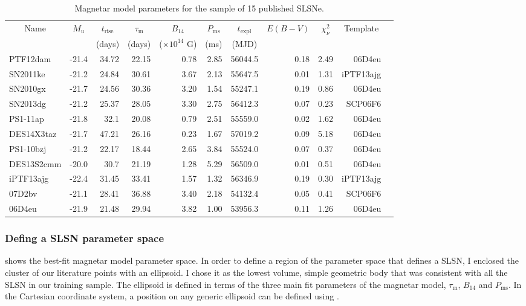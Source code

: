 \begin{table}
\begin{center}
\caption{Magnetar model parameters for the sample of 15 published SLSNe.}
\label{table:Magnetar}
\begin{tabular}{|l|r|r|r|r|r|r|r|r|r|r|}
\hline
  \multicolumn{1}{|c|}{Name} &
  \multicolumn{1}{c|}{$M_u$} &
  \multicolumn{1}{c|}{$t_\mathrm{rise}$} &
  \multicolumn{1}{c|}{$\tau_\mathrm{m}$} &
  \multicolumn{1}{c|}{$B_{14}$} &
  \multicolumn{1}{c|}{$P_{\mathrm{ms}}$} &
  \multicolumn{1}{c|}{$t_\mathrm{expl}$} &
  \multicolumn{1}{c|}{$E(B-V)$} &
  \multicolumn{1}{c|}{$\chi^2_{\nu}$} &
  \multicolumn{1}{c|}{Template} \\ & &
  \multicolumn{1}{c|}{(days)} &
  \multicolumn{1}{c|}{(days)} &
  \multicolumn{1}{c|}{($\times10^{14}$ G)} &
  \multicolumn{1}{c|}{(ms)} &
  \multicolumn{1}{c|}{(MJD)} & \\
\hline
  PTF12dam & -21.4 & 34.72 & 22.15 & 0.78 & 2.85 & 56044.5 & 0.18 & 2.49 & 06D4eu\\
  SN2011ke & -21.2 & 24.84 & 30.61 & 3.67 & 2.13 & 55647.5 & 0.01 & 1.31 & iPTF13ajg\\
  SN2010gx & -21.7 & 24.56 & 30.36 & 3.20 & 1.54 & 55247.1 & 0.19 & 0.86 & 06D4eu\\
  SN2013dg & -21.2 & 25.37 & 28.05 & 3.30 & 2.75 & 56412.3 & 0.07 & 0.23 & SCP06F6\\
  PS1-11ap & -21.8 & 32.1 & 20.08 & 0.79 & 2.51 & 55559.0 & 0.02 & 1.62 & 06D4eu\\
  DES14X3taz & -21.7 & 47.21 & 26.16 & 0.23 & 1.67 & 57019.2 & 0.09 & 5.18 & 06D4eu\\
  PS1-10bzj & -21.2 & 22.17 & 18.44 & 2.65 & 3.84 & 55524.0 & 0.07 & 0.37 & 06D4eu\\
  DES13S2cmm & -20.0 & 30.7 & 21.19 & 1.28 & 5.29 & 56509.0 & 0.01 & 0.51 & 06D4eu\\
  iPTF13ajg & -22.4 & 31.45 & 33.41 & 1.57 & 1.32 & 56346.9 & 0.19 & 0.30 & iPTF13ajg\\
  07D2bv & -21.1 & 28.41 & 36.88 & 3.40 & 2.18 & 54132.4 & 0.05 & 0.41 & SCP06F6\\
  06D4eu & -21.9 & 21.48 & 29.94 & 3.82 & 1.00 & 53956.3 & 0.11 & 1.26 & 06D4eu\\
\hline\end{tabular}
\end{center}
\end{table}

\subsubsection{Defing a SLSN parameter space}
 shows the best-fit magnetar model parameter space. In order to define a region of the parameter space that defines a SLSN, I enclosed the cluster of our literature points with an ellipsoid. I chose it as the lowest volume, simple geometric body that was consistent with all the SLSN in our training sample. The ellipsoid is defined in terms of the three main fit parameters of the magnetar model, $\tau_\mathrm{m}$, $B_{14}$ and $P_{\mathrm{ms}}$. In the Cartesian coordinate system, a position on any generic ellipsoid can be defined using .

